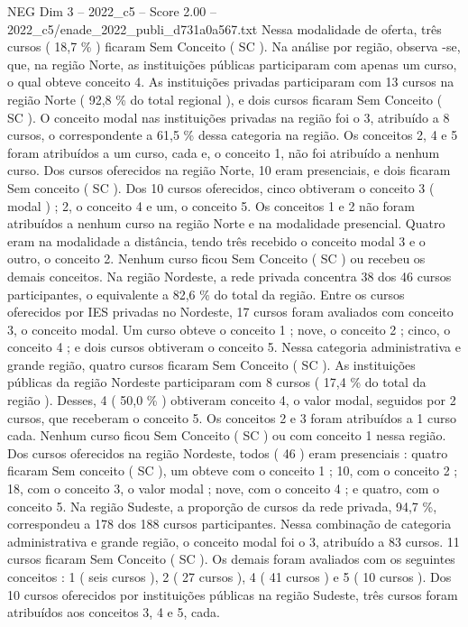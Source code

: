\begin{textsample}{NEG Dim 3 – 2022\_c5 – Score 2.00 – 2022\_c5/enade\_2022\_publi\_d731a0a567.txt}
Nessa modalidade de oferta, três cursos ( 18,7 \% ) ficaram Sem Conceito ( SC ).
Na análise por região, observa -se, que, na região Norte, as instituições públicas participaram com apenas um curso, o qual obteve conceito 4.
As instituições privadas participaram com 13 cursos na região Norte ( 92,8 \% do total regional ), e dois cursos ficaram Sem Conceito ( SC ).
O conceito modal nas instituições privadas na região foi o 3, atribuído a 8 cursos, o correspondente a 61,5 \% dessa categoria na região.
Os conceitos 2, 4 e 5 foram atribuídos a um curso, cada e, o conceito 1, não foi atribuído a nenhum curso.
Dos cursos oferecidos na região Norte, 10 eram presenciais, e dois ficaram Sem conceito ( SC ).
Dos 10 cursos oferecidos, cinco obtiveram o conceito 3 ( modal ) ; 2, o conceito 4 e um, o conceito 5.
Os conceitos 1 e 2 não foram atribuídos a nenhum curso na região Norte e na modalidade presencial.
Quatro eram na modalidade a distância, tendo três recebido o conceito modal 3 e o outro, o conceito 2.
Nenhum curso ficou Sem Conceito ( SC ) ou recebeu os demais conceitos.
Na região Nordeste, a rede privada concentra 38 dos 46 cursos participantes, o equivalente a 82,6 \% do total da região.
Entre os cursos oferecidos por IES privadas no Nordeste, 17 cursos foram avaliados com conceito 3, o conceito modal.
Um curso obteve o conceito 1 ; nove, o conceito 2 ; cinco, o conceito 4 ; e dois cursos obtiveram o conceito 5.
Nessa categoria administrativa e grande região, quatro cursos ficaram Sem Conceito ( SC ).
As instituições públicas da região Nordeste participaram com 8 cursos ( 17,4 \% do total da região ).
Desses, 4 ( 50,0 \% ) obtiveram conceito 4, o valor modal, seguidos por 2 cursos, que receberam o conceito 5.
Os conceitos 2 e 3 foram atribuídos a 1 curso cada.
Nenhum curso ficou Sem Conceito ( SC ) ou com conceito 1 nessa região.
Dos cursos oferecidos na região Nordeste, todos ( 46 ) eram presenciais : quatro ficaram Sem conceito ( SC ), um obteve com o conceito 1 ; 10, com o conceito 2 ; 18, com o conceito 3, o valor modal ; nove, com o conceito 4 ; e quatro, com o conceito 5.
Na região Sudeste, a proporção de cursos da rede privada, 94,7 \%, correspondeu a 178 dos 188 cursos participantes.
Nessa combinação de categoria administrativa e grande região, o conceito modal foi o 3, atribuído a 83 cursos. 11 cursos ficaram Sem Conceito ( SC ).
Os demais foram avaliados com os seguintes conceitos : 1 ( seis cursos ), 2 ( 27 cursos ), 4 ( 41 cursos ) e 5 ( 10 cursos ).
Dos 10 cursos oferecidos por instituições públicas na região Sudeste, três cursos foram atribuídos aos conceitos 3, 4 e 5, cada.

\end{textsample}

